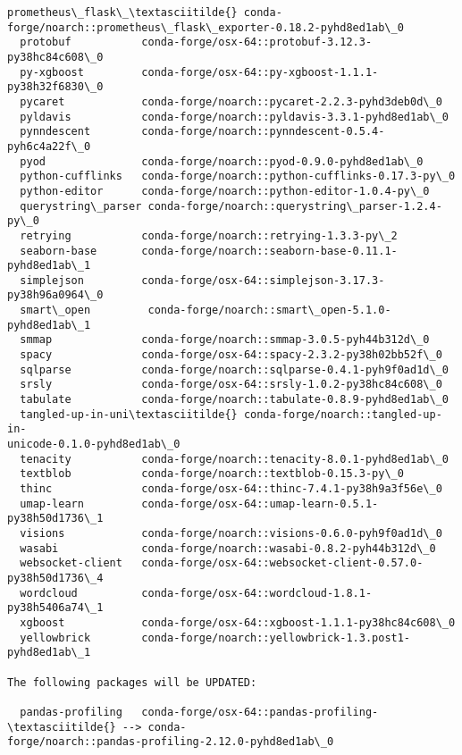 \documentclass[11pt]{article}
\begin{document}
\begin{Verbatim}[commandchars=\\\{\}]
  prometheus\_flask\_\textasciitilde{} conda-
forge/noarch::prometheus\_flask\_exporter-0.18.2-pyhd8ed1ab\_0
  protobuf           conda-forge/osx-64::protobuf-3.12.3-py38hc84c608\_0
  py-xgboost         conda-forge/osx-64::py-xgboost-1.1.1-py38h32f6830\_0
  pycaret            conda-forge/noarch::pycaret-2.2.3-pyhd3deb0d\_0
  pyldavis           conda-forge/noarch::pyldavis-3.3.1-pyhd8ed1ab\_0
  pynndescent        conda-forge/noarch::pynndescent-0.5.4-pyh6c4a22f\_0
  pyod               conda-forge/noarch::pyod-0.9.0-pyhd8ed1ab\_0
  python-cufflinks   conda-forge/noarch::python-cufflinks-0.17.3-py\_0
  python-editor      conda-forge/noarch::python-editor-1.0.4-py\_0
  querystring\_parser conda-forge/noarch::querystring\_parser-1.2.4-py\_0
  retrying           conda-forge/noarch::retrying-1.3.3-py\_2
  seaborn-base       conda-forge/noarch::seaborn-base-0.11.1-pyhd8ed1ab\_1
  simplejson         conda-forge/osx-64::simplejson-3.17.3-py38h96a0964\_0
  smart\_open         conda-forge/noarch::smart\_open-5.1.0-pyhd8ed1ab\_1
  smmap              conda-forge/noarch::smmap-3.0.5-pyh44b312d\_0
  spacy              conda-forge/osx-64::spacy-2.3.2-py38h02bb52f\_0
  sqlparse           conda-forge/noarch::sqlparse-0.4.1-pyh9f0ad1d\_0
  srsly              conda-forge/osx-64::srsly-1.0.2-py38hc84c608\_0
  tabulate           conda-forge/noarch::tabulate-0.8.9-pyhd8ed1ab\_0
  tangled-up-in-uni\textasciitilde{} conda-forge/noarch::tangled-up-in-
unicode-0.1.0-pyhd8ed1ab\_0
  tenacity           conda-forge/noarch::tenacity-8.0.1-pyhd8ed1ab\_0
  textblob           conda-forge/noarch::textblob-0.15.3-py\_0
  thinc              conda-forge/osx-64::thinc-7.4.1-py38h9a3f56e\_0
  umap-learn         conda-forge/osx-64::umap-learn-0.5.1-py38h50d1736\_1
  visions            conda-forge/noarch::visions-0.6.0-pyh9f0ad1d\_0
  wasabi             conda-forge/noarch::wasabi-0.8.2-pyh44b312d\_0
  websocket-client   conda-forge/osx-64::websocket-client-0.57.0-py38h50d1736\_4
  wordcloud          conda-forge/osx-64::wordcloud-1.8.1-py38h5406a74\_1
  xgboost            conda-forge/osx-64::xgboost-1.1.1-py38hc84c608\_0
  yellowbrick        conda-forge/noarch::yellowbrick-1.3.post1-pyhd8ed1ab\_1

The following packages will be UPDATED:

  pandas-profiling   conda-forge/osx-64::pandas-profiling-\textasciitilde{} --> conda-
forge/noarch::pandas-profiling-2.12.0-pyhd8ed1ab\_0




\end{Verbatim}
\end{document}
